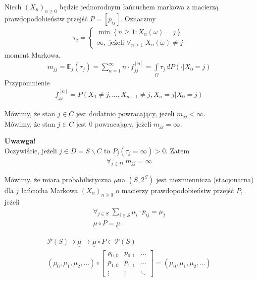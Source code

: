 Niech $ \left(X_n\right)_{n\ge 0} $ będzie jednorodnym łańcuchem markowa z macierzą prawdopodobieństw przejść $ P=[p_{ij}] $. Oznaczmy
\begin{gather*}
\tau_j=\left \{
\begin{array}{l}
	\min\left\{n\ge 1:X_n(\omega)=j\right\}                     \\
	\infty , \text{ jeżeli }\forall_{n\ge 1}\; X_n(\omega)\neq j
\end{array}
\right .
\end{gather*}
moment Markowa.
\begin{gather*}
m_{jj}=\mathbb E _j\left(\tau_j\right)=\sum_{n=1}^{\infty }n\cdot f_{jj}^{[n]}=\int\limits_{\Omega}\tau_j\,dP\left(\cdot|X_0=j\right)
\end{gather*}
Przypomnienie
\begin{gather*}
f_{jj}^{[n]}=P\left(X_1\neq j,\dots,X_{n-1}\neq j,X_n=j|X_0=j\right)
\end{gather*}
\begin{defi}
Mówimy, że stan $ j\in C $ jest dodatnio powracający, jeżeli $ m_{jj}<\infty  $.\\
Mówimy, że stan $ j\in C $ jest 0 powracający, jeżeli $ m_{jj}=\infty  $.
\end{defi}
\textbf{Uwawga!}\\
Oczywiście, jeżeli $ j\in D=S\backslash C $ to $ P_j\left(\tau_j=\infty \right)>0 $. Zatem
\begin{gather*}
\forall_{j\in D}\;m_{jj}=\infty 
\end{gather*}
\begin{defi}
Mówimy, że miara probabilistyczna $ \mu  $na $ (S, 2^S) $ jest niezmiennicza (stacjonarna) dla $ j $ łańcucha Markowa $ \left(X_n\right)_{n\ge 0} $ o macierzy prawdopodobieństw przejść $ P $, jeżeli
\begin{gather*}
\forall_{j\in S}\;\sum_{i\in S}\mu_i\cdot p_{ij}=\mu_j\\
\underline{\mu}\circ P=\underline{\mu}
\end{gather*}
\end{defi}
\begin{gather*}
\mathcal P\left(S\right)\ni\underline{\mu}\to\underline{\mu}\circ P\in \mathcal P\left(S\right)\\
\left(\mu_0,\mu_1,\mu_2,\dots \right)\circ
\begin{bmatrix}
	p_{0,0} & p_{0,1} & \ldots \\
	p_{1,0} & p_{1,1} & \ldots \\
	\vdots  & \vdots  & \ddots
\end{bmatrix}=
\left(\mu_0,\mu_1,\mu_2,\dots \right)
\end{gather*}
